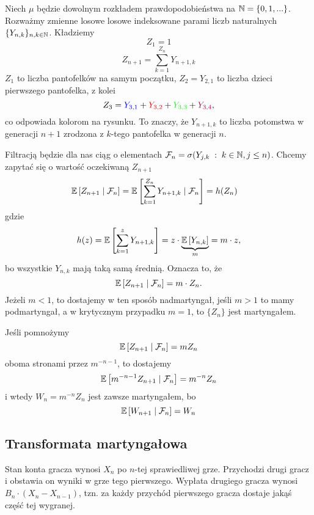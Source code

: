 \begin{example}
\begin{center}
\end{center}

  Niech $\mu$ będzie dowolnym rozkładem prawdopodobieństwa na $\operatorname{\mathbb{N}}=\{0,1,...\}$. Rozważmy zmienne losowe losowe indeksowane parami liczb naturalnych $\{Y_{n,k}\}_{n,k\in\operatorname{\mathbb{N}}}$. Kładziemy 
  $$Z_1=1$$
  $$Z_{n+1}=\sum_{k=1}^{Z_n}Y_{n+1,k}$$
  $Z_1$ to liczba pantofelków na samym początku, $Z_2=Y_{2,1}$ to liczba dzieci pierwszego pantofelka, z kolei
  $$Z_3={\color{blue}Y_{3,1}}+{\color{red}Y_{3,2}}+{\color{green}Y_{3,3}}+{\color{purple}Y_{3,4}},$$
  co odpowiada kolorom na rysunku. To znaczy, że $Y_{n+1,k}$ to liczba potomstwa w generacji $n+1$ zrodzona z $k$-tego pantofelka w generacji $n$.

  Filtracją będzie dla nas ciąg o elementach $\mathcal{F}_n=\sigma(Y_{j,k}\;:\;k\in\operatorname{\mathbb{N}},j\leq n)$. Chcemy zapytać się o wartość oczekiwaną $Z_{n+1}$
  \begin{align*}
    \expected{Z_{n+1}}{\set{F}_n}&=\expected{\sum^{Z_n}_{k=1}Y_{n+1,k}}{\set{F}_n}=h(Z_n)
  \end{align*}
  gdzie 
  $$h(z)=\expected{\sum_{k=1}^zY_{{n+1},k}}=z\cdot \underbrace{\expected{Y_{n,k}}}_{m}=m\cdot z,$$
  bo wszystkie $Y_{n,k}$ mają taką samą średnią. Oznacza to, że
  $$\expected{Z_{n+1}}{\set{F}_n}=m\cdot Z_n.$$
  Jeżeli $m< 1$, to dostajemy w ten sposób nadmartyngał, jeśli $m> 1$ to mamy podmartyngał, a w krytycznym przypadku $m=1$, to $\{Z_n\}$ jest martyngałem.

  Jeśli pomnożymy
  $$\expected{Z_{n+1}}{\set{F}_n}=mZ_n$$
  oboma stronami przez $m^{-n-1}$, to dostajemy
  $$\expected{m^{-n-1}Z_{n+1}}{\set{F}_n}=m^{-n}Z_n$$
  i wtedy $W_n=m^{-n}Z_n$ jest zawsze martyngałem, bo
  $$\expected{W_{n+1}}{\set{F}_n}=W_n$$
\end{example}

\subsection{Transformata martyngałowa}

Stan konta gracza wynosi $X_n$ po $n$-tej sprawiedliwej grze. Przychodzi drugi gracz i obstawia on wyniki w grze tego pierwszego. Wypłata drugiego gracza wynosi $B_n\cdot (X_n-X_{n-1})$, tzn. za każdy przychód pierwszego gracza dostaje jakąś część tej wygranej.

